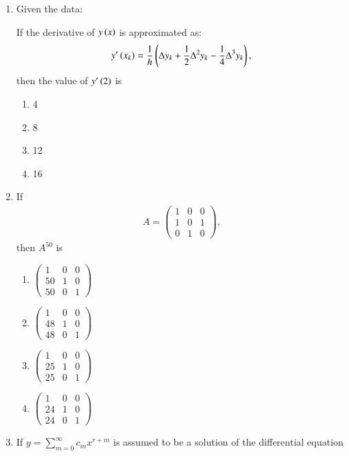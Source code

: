 \documentclass[journal,12pt,twocolumn]{IEEEtran}
\theoremstyle{remark}
\begin{document}
\begin{enumerate}
\item Given the data:

	\begin{table}[h!]
		\centering
		
	\end{table}

If the derivative of $y \left(x\right)$ is approximated as:
\begin{align}
y^\prime \left(x_k\right) = \frac{1}{h} \left( \Delta y_k + \frac{1}{2} \Delta^2 y_k - \frac{1}{4} \Delta^3 y_k \right),
\end{align}
then the value of $y^\prime \left(2\right)$ is

\begin{enumerate}
    \item 4
    \item 8
    \item 12
    \item 16
\end{enumerate}

\item If 
\begin{align}
A = \begin{pmatrix}
1 & 0 & 0 \\
1 & 0 & 1 \\
0 & 1 & 0
\end{pmatrix},
\end{align}
then $A^{50}$ is

\begin{enumerate}
    \item $\begin{pmatrix} 1 & 0 & 0 \\ 50 & 1 & 0 \\ 50 & 0 & 1 \end{pmatrix}$
    \item $\begin{pmatrix} 1 & 0 & 0 \\ 48 & 1 & 0 \\ 48 & 0 & 1 \end{pmatrix}$
    \item $\begin{pmatrix} 1 & 0 & 0 \\ 25 & 1 & 0 \\ 25 & 0 & 1 \end{pmatrix}$
    \item $\begin{pmatrix} 1 & 0 & 0 \\ 24 & 1 & 0 \\ 24 & 0 & 1 \end{pmatrix}$
\end{enumerate}
\item If $y = \sum_{m=0}^{\infty} c_m x^{r+m}$ is assumed to be a solution of the differential equation


\end{enumerate}
\end{document}
